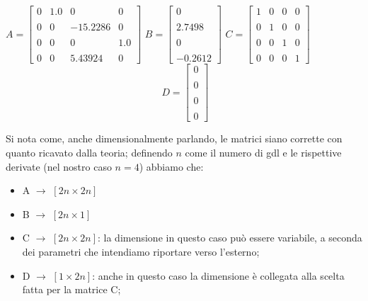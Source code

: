 \begin{center}
	$
	A=\left\lbrack
	\begin{array}{cccc}
		0  & 1.0  & 0  & 0 \\\\
		0 & 0 & -15.2286 & 0 \\\\
		0  & 0  & 0  & 1.0 \\\\
		0  & 0  & 5.43924 & 0
	\end{array}\right\rbrack
	$
	$
	B=\left\lbrack \begin{array}{c}
		0 \\\\
		2.7498 \\\\
		0 \\\\
		-0.2612 
	\end{array}\right\rbrack
	$
	$
	C=\left\lbrack 
	\begin{array}{cccc}
		1  & 0 & 0 & 0 \\\\
		0  & 1 & 0  & 0 \\\\
		0  & 0 & 1 & 0 \\\\
		0  & 0 & 0  & 1
	\end{array}\right\rbrack
	$
	$$
	\;D=\left\lbrack 
	\begin{array}{c}
		0 \\\\
		0 \\\\
		0 \\\\
		0
	\end{array}\right\rbrack
	$$
\end{center}

Si nota come, anche dimensionalmente parlando, le matrici siano corrette con quanto ricavato dalla teoria; definendo $n$ come il numero di gdl e le rispettive derivate (nel nostro caso $n = 4$) abbiamo che:
\begin{itemize}
	\item A $\rightarrow$ $[2n \times 2n]$
	\item B $\rightarrow$ $[2n \times 1]$
	\item C $\rightarrow$ $[2n \times 2n]$: la dimensione in questo caso può essere variabile, a seconda dei parametri che intendiamo riportare verso l'esterno;
	\item D $\rightarrow$ $[1 \times 2n]$: anche in questo caso la dimensione è collegata alla scelta fatta per la matrice C;
\end{itemize}

